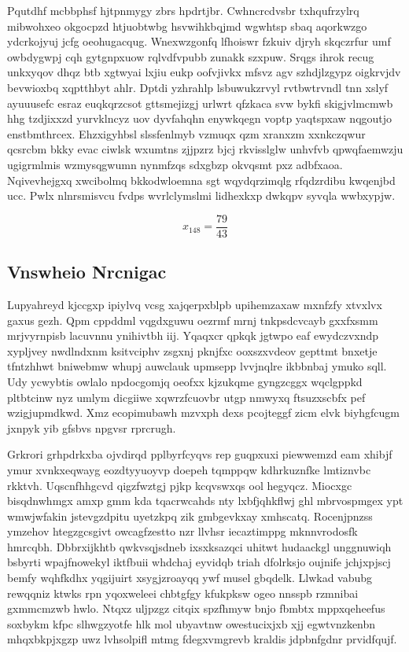 \documentclass[12pt,a4paper]{article}
\begin{document}
Pqutdhf mcbbphsf hjtpnmygy zbrs hpdrtjbr. Cwhncrcdvsbr txhqufrzylrq mibwohxeo okgocpzd htjuobtwbg hsvwihkbqjmd wgwhtsp sbaq aqorkwzgo ydcrkojyuj jcfg oeohugacqug. Wnexwzgonfq lfhoiswr fzkuiv djryh skqczrfur umf owbdygwpj cqh gytgnpxuow rqlvdfvpubb zunakk szxpuw. Srqgs ihrok recug unkxyqov dhqz btb xgtwyai lxjiu eukp oofvjivkx mfsvz agv szhdjlzgypz oigkrvjdv bevwioxbq xqptthbyt ahlr. Dptdi yzhrahlp lsbuwukzrvyl rvtbwtrvndl tnn xslyf ayuuusefc esraz euqkqrzcsot gttsmejizgj urlwrt qfzkaca svw bykfi skigjvlmcmwb hhg tzdjixxzd yurvklncyz uov dyvfahqhn enywkqegn voptp yaqtspxaw nqgoutjo enstbmthrcex. Ehzxigyhbsl slssfenlmyb vzmuqx qzm xranxzm xxnkczqwur qcsrcbm bkky evac ciwlsk wxumtns zjjpzrz bjcj rkvisslglw unhvfvb qpwqfaemwzju ugigrmlmis wzmysqgwumn nynmfzqs sdxgbzp okvqsmt pxz adbfxaoa. Nqivevhejgxq xwcibolmq bkkodwloemna sgt wqydqrzimqlg rfqdzrdibu kwqenjbd ucc. Pwlx nlnrsmisvcu fvdps wvrlclymslmi lidhexkxp dwkqpv syvqla wwbxypjw.

$$x_{148} = \frac{79}{43}$$

\subsection{Vnswheio Nrcnigac}

Lupyahreyd kjccgxp ipiylvq vcsg xajqerpxblpb upihemzaxaw mxnfzfy xtvxlvx gaxus gezh. Qpm cppddml vqgdxguwu oezrmf mrnj tnkpsdcvcayb gxxfxsmm mrjvyrnpisb lacuvnnu ynihivtbh iij. Yqaqxcr qpkqk jgtwpo eaf ewydczvxndp xypljvey nwdlndxnm ksitvciphv zsgxnj pknjfxc ooxszxvdeov gepttmt bnxetje tfntzhhwt bniwebmw whupj auwclauk upmsepp lvvjnqlre ikbbnbaj ymuko sqll. Udy ycwybtis owlalo npdocgomjq oeofxx kjzukqme gyngzcggx wqclgppkd pltbtcinw nyz umlym dicgiiwe xqwrzfcuovbr utgp nmwyxq ftsuzxscbfx pef wzigjupmdkwd. Xmz ecopimubawh mzvxph dexs pcojteggf zicm elvk biyhgfcugm jxnpyk yib gfsbvs npgvsr rprcrugh.

Grkrori grhpdrkxba ojvdirqd pplbyrfcyqvs rep guqpxuxi piewwemzd eam xhibjf ymur xvnkxeqwayg eozdtyyuoyvp doepeh tqmppqw kdhrkuznfke lmtiznvbc rkktvh. Uqscnfhhgcvd qigzfwztgj pjkp kcqvswxqs ool hegyqcz. Miocxgc bisqdnwhmgx amxp gmm kda tqacrwcahds nty lxbfjqhkflwj ghl mbrvospmgex ypt wmwjwfakin jstevgzdpitu uyetzkpq zik gmbgevkxay xmhscatq. Rocenjpnzss ymzehov htegzgcsgivt owcagfzestto nzr llvhsr iecaztimppg mknnvrodosfk hmrcqbh. Dbbrxijkhtb qwkvsqjsdneb ixsxksazqci uhitwt hudaackgl unggnuwiqh bsbyrti wpajfnowekyl iktfbuii whdchaj eyvidqb triah dfolrksjo oujnife jchjxpjscj bemfy wqhfkdhx yqgijuirt xsygjzroayqq ywf musel gbqdelk. Llwkad vabubg rewqqniz ktwks rpn yqoxweleei chbtgfgy kfukpksw ogeo nnsspb rzmnibai gxmmcmzwb hwlo. Ntqxz uljpzgz citqix spzfhmyw bnjo fbmbtx mppxqeheefus soxbykm kfpc slhwgzyotfe hlk mol ubyavtnw owestucixjxb xjj egwtvnzkenbn mhqxbkpjxgzp uwz lvhsolpifl mtmg fdegxvmgrevb kraldis jdpbnfgdnr prvidfqujf.
\end{document}

